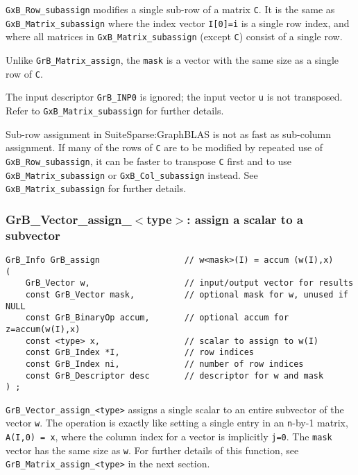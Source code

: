 \documentclass[12pt]{article}
\begin{document}
\verb'GxB_Row_subassign' modifies a single sub-row of a matrix \verb'C'.  It is
the same as \verb'GxB_Matrix_subassign' where the index vector \verb'I[0]=i' is a
single row index, and where all matrices in \verb'GxB_Matrix_subassign' (except
\verb'C') consist of a single row. 

Unlike \verb'GrB_Matrix_assign', the \verb'mask' is a vector with the same size
as a single row of \verb'C'.

The input descriptor \verb'GrB_INP0' is ignored; the input vector \verb'u' is
not transposed.  Refer to \verb'GxB_Matrix_subassign' for further details.

Sub-row assignment in SuiteSparse:GraphBLAS is not as fast as sub-column
assignment.  If many of the rows of \verb'C' are to be modified by repeated use
of \verb'GxB_Row_subassign', it can be faster to transpose \verb'C' first and
to use \verb'GxB_Matrix_subassign' or \verb'GxB_Col_subassign' instead.  See
\verb'GxB_Matrix_subassign' for further details.

\newpage
\subsubsection{{\sf GrB\_Vector\_assign\_$<$type$>$:} assign a scalar to a subvector}
\label{assign_vector_scalar}

\begin{mdframed}[userdefinedwidth=6in]
{\footnotesize
\begin{verbatim}
GrB_Info GrB_assign                 // w<mask>(I) = accum (w(I),x)
(
    GrB_Vector w,                   // input/output vector for results
    const GrB_Vector mask,          // optional mask for w, unused if NULL
    const GrB_BinaryOp accum,       // optional accum for z=accum(w(I),x)
    const <type> x,                 // scalar to assign to w(I)
    const GrB_Index *I,             // row indices
    const GrB_Index ni,             // number of row indices
    const GrB_Descriptor desc       // descriptor for w and mask
) ;
\end{verbatim} } \end{mdframed}

\verb'GrB_Vector_assign_<type>' assigns a single scalar to an entire subvector
of the vector \verb'w'.  The operation is exactly like setting a single entry
in an \verb'n'-by-1 matrix, \verb'A(I,0) = x', where the column index for a
vector is implicitly \verb'j=0'.  The \verb'mask' vector has the same size as
\verb'w'.  For further details of this function, see
\verb'GrB_Matrix_assign_<type>' in the next section.
\end{document}
